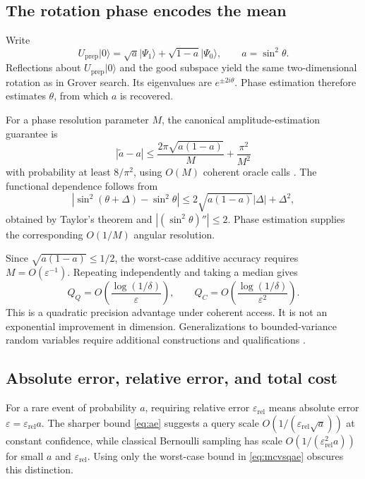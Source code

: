 \documentclass[11pt,a4paper]{article}
\newcommand{\ket}[1]{\lvert #1\rangle}
\theoremstyle{definition}
\theoremstyle{remark}
\numberwithin{equation}{section}
\begin{document}
\subsection{The rotation phase encodes the mean}
Write
\begin{equation}
 U_{\mathrm{prep}}\ket{0}=\sqrt a\ket{\Psi_1}+\sqrt{1-a}\ket{\Psi_0},\qquad a=\sin^2\theta.
\end{equation}
Reflections about $U_{\mathrm{prep}}\ket{0}$ and the good subspace yield the same
two-dimensional rotation as in Grover search. Its eigenvalues are
$e^{\pm2i\theta}$. Phase estimation therefore estimates $\theta$, from
which $a$ is recovered.

For a phase resolution parameter $M$, the canonical amplitude-estimation
guarantee is
\begin{equation}\label{eq:ae}
 |\widetilde a-a|
 \leq\frac{2\pi\sqrt{a(1-a)}}M+\frac{\pi^2}{M^2}
\end{equation}
with probability at least $8/\pi^2$, using $O(M)$ coherent oracle calls
\citep{brassard2002}. The functional dependence follows from
\begin{equation}
 \left|\sin^2(\theta+\Delta)-\sin^2\theta\right|
 \leq 2\sqrt{a(1-a)}|\Delta|+\Delta^2,
\end{equation}
obtained by Taylor's theorem and $|(\sin^2\theta)''|\leq2$.
Phase estimation supplies the corresponding $O(1/M)$ angular resolution.

Since $\sqrt{a(1-a)}\leq1/2$, the worst-case additive accuracy requires
$M=O(\varepsilon^{-1})$. Repeating independently and taking a median gives
\begin{equation}\label{eq:mcvsqae}
 Q_Q=O\!\left(\frac{\log(1/\delta)}{\varepsilon}\right),\qquad
 Q_C=O\!\left(\frac{\log(1/\delta)}{\varepsilon^2}\right).
\end{equation}
This is a quadratic precision advantage under coherent access. It is not an
exponential improvement in dimension. Generalizations to bounded-variance
random variables require additional constructions and qualifications
\citep{montanaro2015}.

\subsection{Absolute error, relative error, and total cost}
For a rare event of probability $a$, requiring relative error $\varepsilon_{\mathrm{rel}}$
means absolute error $\varepsilon=\varepsilon_{\mathrm{rel}} a$. The sharper bound
\eqref{eq:ae} suggests a query scale
$O(1/(\varepsilon_{\mathrm{rel}}\sqrt a))$ at constant confidence, while classical Bernoulli
sampling has scale $O(1/(\varepsilon_{\mathrm{rel}}^2a))$ for small $a$ and $\varepsilon_{\mathrm{rel}}$.
Using only the worst-case bound in \eqref{eq:mcvsqae} obscures this distinction.
\end{document}
